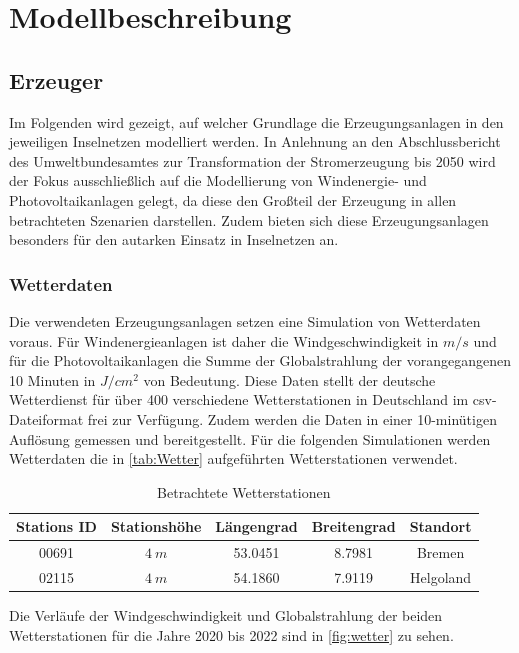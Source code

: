 \chapter{Modellbeschreibung}\label{Modellbeschreibung}
\section{Erzeuger}\label{Erzeuger}

Im Folgenden wird gezeigt, auf welcher Grundlage die Erzeugungsanlagen in den jeweiligen Inselnetzen modelliert werden. In Anlehnung an den Abschlussbericht des Umweltbundesamtes zur Transformation der Stromerzeugung bis 2050 wird der Fokus ausschließlich auf die Modellierung von Windenergie- und Photovoltaikanlagen gelegt, da diese den Großteil der Erzeugung in allen betrachteten Szenarien darstellen. \cite{Energiewende} Zudem bieten sich diese Erzeugungsanlagen besonders für den autarken Einsatz in Inselnetzen an.

\subsection{Wetterdaten}

Die verwendeten Erzeugungsanlagen setzen eine Simulation von Wetterdaten voraus. Für Windenergieanlagen ist daher die Windgeschwindigkeit in $m/s$  und für die Photovoltaikanlagen die Summe der Globalstrahlung der vorangegangenen 10 Minuten in $J/cm^2$ von Bedeutung. Diese Daten stellt der deutsche Wetterdienst für über 400 verschiedene Wetterstationen in Deutschland im csv-Dateiformat frei zur Verfügung. Zudem werden die Daten in einer 10-minütigen Auflösung gemessen und bereitgestellt. Für die folgenden Simulationen werden Wetterdaten die in \autoref{tab:Wetter} aufgeführten Wetterstationen verwendet.

\begin{table} [H]
	\begin{tabular}[htpb]{c|c|c|c|c}
		Stations ID & Stationshöhe & Längengrad & Breitengrad & Standort \\
		\hline
		00691 & $4~m$ & 53.0451 & 8.7981 & Bremen \\
		02115 & $4~m$ & 54.1860 & 7.9119 & Helgoland
	\end{tabular}
	\centering
	\caption{Betrachtete Wetterstationen}
	\label{tab:Wetter}
\end{table}

Die Verläufe der Windgeschwindigkeit und Globalstrahlung der beiden Wetterstationen für die Jahre 2020 bis 2022 sind in \autoref{fig:wetter} zu sehen.

